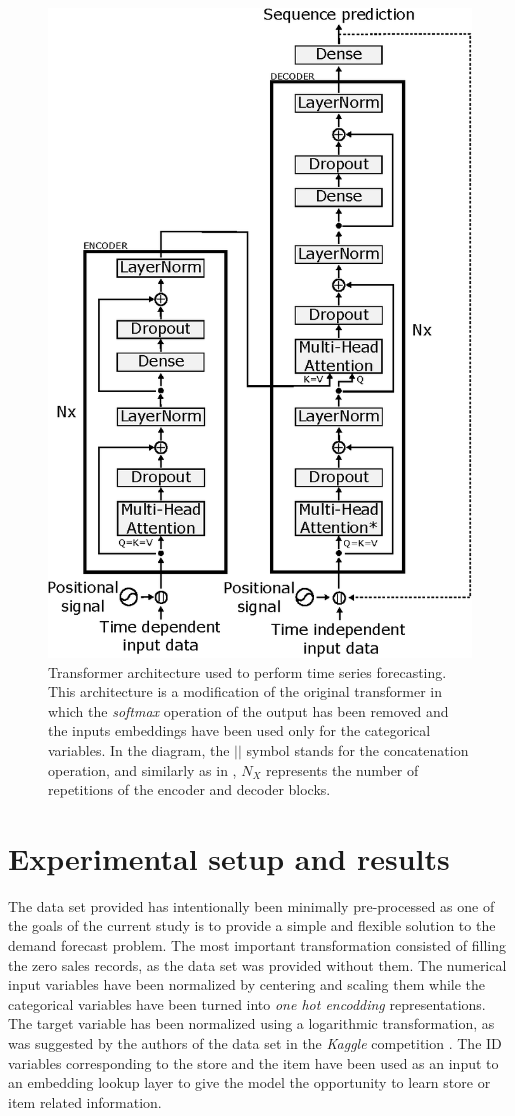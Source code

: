 \documentclass{elsarticle}
\begin{document}
    \begin{figure}[h!]
    	\centering
    	\includegraphics[width=0.7\linewidth]{img/transformer}
    	\caption{Transformer architecture used to perform time series forecasting. This architecture is a modification of the original transformer in which the \textit{softmax} operation of the output has been removed and the inputs embeddings have been used only for the categorical variables. In the diagram, the $||$ symbol stands for the concatenation operation, and similarly as in \cite{vaswani2017}, $N_X$ represents the number of repetitions of the encoder and decoder blocks.}
    	\label{fig:transformer}
    \end{figure}
    
    
	\section{Experimental setup and results} \label{sec:results}
	The data set provided has intentionally been minimally pre-processed as one of the goals of the current study is to provide a simple and flexible solution to the demand forecast problem. The most important transformation consisted of filling the zero sales records, as the data set was provided without them. The numerical input variables have been normalized by centering and scaling them while the categorical variables have been turned into \textit{one hot encodding} representations. The target variable has been normalized using a logarithmic transformation, as was suggested by the authors of the data set in the \textit{Kaggle} competition \cite{corporacionfavoritadataset2018}. The ID variables corresponding to the store and the item have been used as an input to an embedding lookup layer to give the model the opportunity to learn store or item related information.
	
\end{document}
